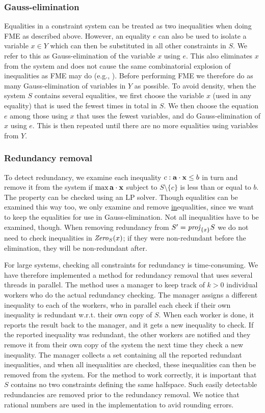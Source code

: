 \subsubsection{Gauss-elimination} 
Equalities in a constraint system can be treated as two inequalities when doing FME as described above. However, an equality $e$ can also be used to isolate a variable $x\in Y$ which can then be substituted in all other constraints in $S$. We refer to this as Gauss-elimination of the variable $x$ using $e$. This also eliminates $x$ from the system and does not cause the same combinatorial explosion of inequalities as FME may do (e.g., \cite{duffin74,simon05}). Before performing FME we therefore do as many Gauss-elimination of variables in $Y$ as possible. To avoid density, when the system $S$ contains several equalities, we first choose the variable $x$ (used in any equality) that is used the fewest times in total in $S$. We then choose the equation $e$ among those using $x$ that uses the fewest variables, and do Gauss-elimination of $x$ using $e$.  This is then repeated until there are no more equalities using variables from $Y$.

\subsubsection{Redundancy removal} 
To detect redundancy, we examine each inequality $c: \mathbf{a}\cdot \mathbf{x}\leq b$ in turn and remove it from the system if $\max \mathbf{a}\cdot \mathbf{x}$ subject to $S\setminus\{c\}$ is less than or equal to $b$. The property can be checked using an LP solver. Though equalities can be examined this way too, we only examine and remove \underline{in}equalities, since we want to keep the equalities for use in Gauss-elimination. Not all inequalities have to be examined, though. When removing redundancy from $S' = \mathit{proj}_{\{x\}}S$ we do not need to check inequalities in $\mathit{Zero}_S(x)$; if they were non-redundant before the elimination, they will be non-redundant after.

For large systems, checking all constraints for redundancy is time-consuming. We have therefore implemented a method for redundancy removal that uses several threads in parallel. The method uses a manager to keep track of $k>0$ individual workers who do the actual redundancy checking.
The manager assigns a different inequality to each of the workers, who in parallel each check if their own inequality is redundant w.r.t. their own copy of $S$. When each worker is done, it reports the result back to the manager, and it gets a new inequality to check. If the reported inequality was redundant, the other workers are notified and they remove it from their own copy of the system the next time they check a new inequality. The manager collects a set containing all the reported redundant inequalities, and when all inequalities are checked, these inequalities can then be removed from the system. For the method to work correctly, it is important that $S$ contains no two constraints defining the same halfspace. Such easily detectable redundancies are removed prior to the redundancy removal. We notice that rational numbers are used in the implementation to avid rounding errors. 

